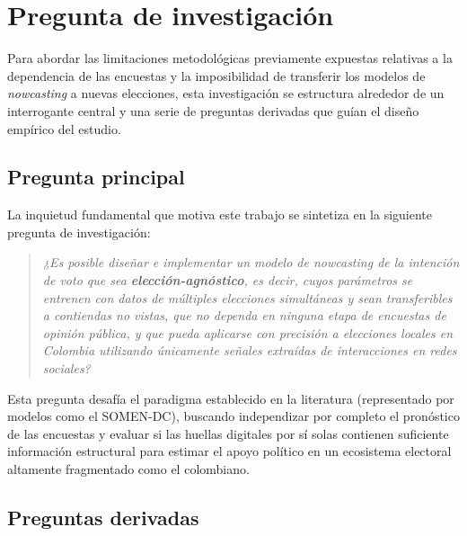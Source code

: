 

\chapter{Pregunta de investigación}\label{ch:pregunta}

Para abordar las limitaciones metodológicas previamente expuestas relativas a la dependencia de las encuestas y la imposibilidad de transferir los modelos de \textit{nowcasting} a nuevas elecciones, esta investigación se estructura alrededor de un interrogante central y una serie de preguntas derivadas que guían el diseño empírico del estudio.

\section{Pregunta principal}

La inquietud fundamental que motiva este trabajo se sintetiza en la siguiente pregunta de investigación:

\begin{quote}
    \textit{¿Es posible diseñar e implementar un modelo de nowcasting de la intención de voto que sea \textbf{elección-agnóstico}, es decir, cuyos parámetros se entrenen con datos de múltiples elecciones simultáneas y sean transferibles a contiendas no vistas, que no dependa en ninguna etapa de encuestas de opinión pública, y que pueda aplicarse con precisión a elecciones locales en Colombia utilizando únicamente señales extraídas de interacciones en redes sociales?}
\end{quote}

Esta pregunta desafía el paradigma establecido en la literatura (representado por modelos como el SOMEN-DC), buscando independizar por completo el pronóstico de las encuestas y evaluar si las huellas digitales por sí solas contienen suficiente información estructural para estimar el apoyo político en un ecosistema electoral altamente fragmentado como el colombiano.

\section{Preguntas derivadas}

